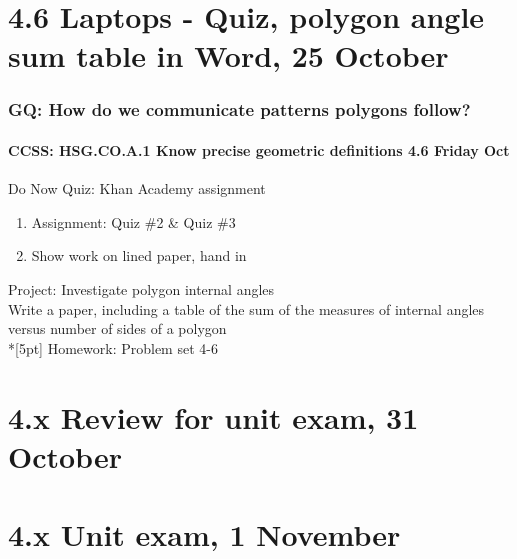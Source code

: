 \documentclass{beamer}
\begin{document}
\section{4.6 Laptops - Quiz, polygon angle sum table in Word, 25 October}
\frame
{
  \frametitle{GQ: How do we communicate patterns polygons follow?}
  \framesubtitle{CCSS: HSG.CO.A.1 Know precise geometric definitions \hfill \alert{4.6 Friday Oct}}

  \begin{block}{Do Now Quiz: Khan Academy assignment}
  \begin{enumerate}
    \item Assignment: Quiz \#2 \& Quiz \#3
    \item Show work on lined paper, hand in
  \end{enumerate}
  \end{block}
  Project: Investigate polygon internal angles\\
  Write a paper, including a table of the sum of the measures of internal angles versus number of sides of a polygon \\*[5pt]
  Homework: Problem set 4-6
}

\section{4.x Review for unit exam, 31 October}

\section{4.x Unit exam, 1 November}
\end{document}

